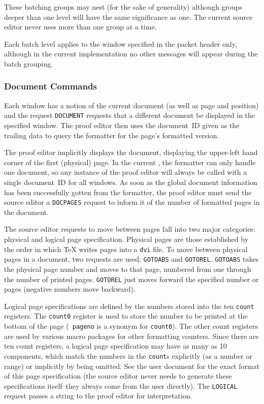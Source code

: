 These batching groups may nest (for the sake of generality) although
groups deeper than one level will have the same significance as one.
The current source editor never uses more than one group at a time.

Each batch level applies to the window specified in the packet header
only, although in the current implementation no other messages will appear
during the batch grouping.

\subsubsection{Document Commands}

Each window has a notion of the current document (as well as page and
position) and the request {\tt DOCUMENT} requests that a different
document be displayed in the specified window.  The proof editor then
uses the document~ID given as the trailing data to query the formatter
for the page's formatted version.

The proof editor implicitly displays the document, displaying the
upper-left hand corner of the first (physical) page.  In the current
{\VorTeX}, the formatter can only handle one document, so any instance
of the proof editor will always be called with a single document~ID
for all windows.  As soon as the global document information
has been successfully gotten from the formatter, the proof editor must
send the source editor a {\tt DOCPAGES} request to inform it of the
number of formatted pages in the document.

The source editor requests to move between pages fall into two major
categories: physical and logical page specification.  Physical pages
are those established by the order in which {\TeX} writes pages into a
{\tt dvi} file.  To move between physical pages in a document, two
requests are used: {\tt GOTOABS} and {\tt GOTOREL}.  {\tt GOTOABS}
takes the physical page number and moves to that page, numbered from
one through the number of printed pages.  {\tt GOTOREL} just moves
forward the specified number or pages (negative numbers move backward).

Logical page specifications are defined by the numbers stored into the
ten {\tt \bsl count} registers.  The {\tt \bsl count0} register is used to
store the number to be printed at the bottom of the page ({\tt
\bsl pageno} is a synonym for {\tt \bsl count0}).  The other count registers
are used by various macro packages for other formatting counters.
Since there are ten count registers, a logical page specification may
have as many as 10 components, which match the numbers in the
{\tt\bsl count}s explicitly (as a number or range) or implicitly by being
omitted.  See the user document for the exact format of this page
specification (the source editor never needs to generate these
specifications itself--they always come from the user directly).
The {\tt LOGICAL} request passes a string to the proof editor for
interpretation.


